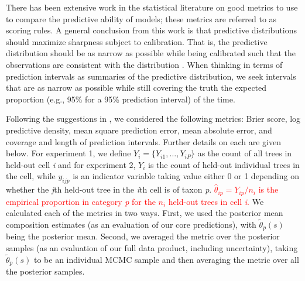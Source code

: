 \documentclass[10pt,letterpaper]{article}
\begin{document}
There has been extensive work in the statistical literature on good
metrics to use to compare the predictive ability of models; these
metrics are referred to as scoring rules. A general conclusion from
this work is that predictive distributions should maximize sharpness
subject to calibration. That is, the predictive distribution should
be as narrow as possible while being calibrated such that the observations
are consistent with the distribution \cite{Gnei:etal:2007}. When
thinking in terms of prediction intervals as summaries of the predictive
distribution, we seek intervals that are as narrow as possible while
still covering the truth the expected proportion (e.g., 95\% for a
95\% prediction interval) of the time. 

Following the suggestions in \cite{Gnei:etal:2007}, we considered
the following metrics: Brier score, log predictive density, mean square
prediction error, mean absolute error, and coverage and length of
prediction intervals. Further details on each are given below. For
experiment 1, we define $Y_{i}=\{Y_{i1},\ldots,Y_{iP}\}$ as the count
of all trees in held-out cell \emph{i} and for experiment 2, $Y_{i}$
is the count of held-out individual trees in the cell, while $y_{ijp}$
is an indicator variable taking value either 0 or 1 depending on whether
the \emph{j}th held-out tree in the \emph{i}th cell is of taxon \emph{p}. \textcolor{red}{$\hat{\theta}_{ip}=Y_{ip}/n_{i}$
is the empirical proportion in category \emph{p} for the $n_{i}$ held-out
trees in cell \emph{i}.} We calculated each of the metrics in two ways.
First, we used the posterior mean composition estimates (as an evaluation
of our core predictions), with $\tilde{\theta}_{p}(s)$ being the
posterior mean. Second, we averaged the metric over the posterior
samples (as an evaluation of our full data product, including uncertainty),
taking $\tilde{\theta}_{p}(s)$ to be an individual MCMC sample and
then averaging the metric over all the posterior samples. 
\end{document}
